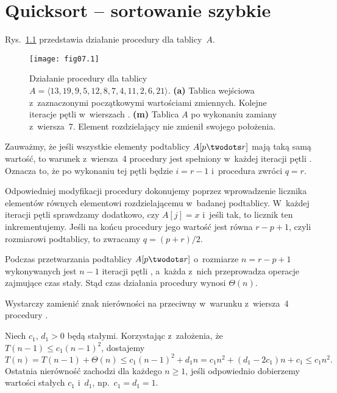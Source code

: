 \chapter{Quicksort -- sortowanie szybkie}


\exercise %
Rys.~\ref{fig:7.1-1} przedstawia działanie procedury  dla tablicy~$A$.
\begin{figure}[ht]
	\begin{center}
		\texttt{[image: fig07.1]}
	\end{center}
	\caption{Działanie procedury  dla tablicy $A=\langle13,19,9,5,12,8,7,4,11,2,6,21\rangle$. {\sffamily\bfseries(a)} Tablica wejściowa z~zaznaczonymi początkowymi wartościami zmiennych. {\sffamily\bfseries{}} Kolejne iteracje pętli  w~wierszach . {\sffamily\bfseries(m)} Tablica $A$ po wykonaniu zamiany z~wiersza~7. Element rozdzielający nie zmienił swojego położenia.} \label{fig:7.1-1}
\end{figure}

\exercise %
Zauważmy, że jeśli wszystkie elementy podtablicy $A[p\twodots r]$ mają taką samą wartość, to warunek z~wiersza~4 procedury  jest spełniony w~każdej iteracji pętli . Oznacza to, że po wykonaniu tej pętli będzie $i=r-1$ i~procedura zwróci $q=r$.

Odpowiedniej modyfikacji procedury dokonujemy poprzez wprowadzenie licznika elementów równych elementowi rozdzielającemu w~badanej podtablicy. W~każdej iteracji pętli  sprawdzamy dodatkowo, czy $A[j]=x$ i~jeśli tak, to licznik ten inkrementujemy. Jeśli na końcu procedury jego wartość jest równa $r-p+1$, czyli rozmiarowi podtablicy, to zwracamy $q=(p+r)/2$.

\exercise %
Podczas przetwarzania podtablicy $A[p\twodots r]$ o~rozmiarze $n=r-p+1$ wykonywanych jest $n-1$ iteracji pętli , a~każda z~nich przeprowadza operacje zajmujące czas stały. Stąd czas działania procedury  wynosi $\Theta(n)$.

\exercise %
Wystarczy zamienić znak nierówności na przeciwny w~warunku z~wiersza~4 procedury .


\exercise %
Niech $c_1$, $d_1>0$ będą stałymi. Korzystając z~założenia, że $T(n-1)\le c_1(n-1)^2$, dostajemy
\[
	T(n) = T(n-1)+\Theta(n) \le c_1(n-1)^2+d_1n = c_1n^2+(d_1-2c_1)n+c_1 \le c_1n^2.
\]
Ostatnia nierówność zachodzi dla każdego $n\ge1$, jeśli odpowiednio dobierzemy wartości stałych $c_1$ i~$d_1$, np.\ $c_1=d_1=1$.

